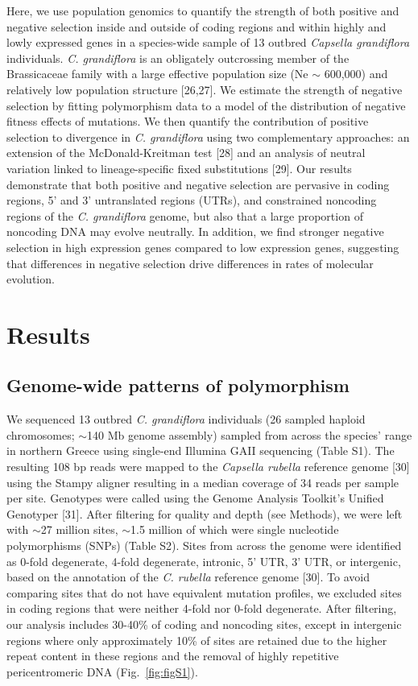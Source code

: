 Here, we use population genomics to quantify the strength of both positive and negative selection inside and outside of coding regions and within highly and lowly expressed genes in a species-wide sample of 13 outbred \textit{Capsella grandiflora} individuals. \textit{C. grandiflora} is an obligately outcrossing member of the Brassicaceae family with a large effective population size (Ne $\sim$ 600,000) and relatively low population structure [26,27]. We estimate the strength of negative selection by fitting polymorphism data to a model of the distribution of negative fitness effects of mutations. We then quantify the contribution of positive selection to divergence in \textit{C. grandiflora} using two complementary approaches: an extension of the McDonald-Kreitman test [28] and an analysis of neutral variation linked to lineage-specific fixed substitutions [29]. Our results demonstrate that both positive and negative selection are pervasive in coding regions, 5’ and 3’ untranslated regions (UTRs), and constrained noncoding regions of the \textit{C. grandiflora} genome, but also that a large proportion of noncoding DNA may evolve neutrally. In addition, we find stronger negative selection in high expression genes compared to low expression genes, suggesting that differences in negative selection drive differences in rates of molecular evolution.

\section{Results}
\subsection{Genome-wide patterns of polymorphism}

We sequenced 13 outbred \textit{C. grandiflora} individuals (26 sampled haploid chromosomes; $\sim$140 Mb genome assembly) sampled from across the species' range in northern Greece using single-end Illumina GAII sequencing (Table S1). The resulting 108 bp reads were mapped to the \textit{Capsella rubella} reference genome [30] using the Stampy aligner resulting in a median coverage of 34 reads per sample per site. Genotypes were called using the Genome Analysis Toolkit’s Unified Genotyper [31]. After filtering for quality and depth (see Methods), we were left with $\sim$27 million sites, $\sim$1.5 million of which were single nucleotide polymorphisms (SNPs) (Table S2). Sites from across the genome were identified as 0-fold degenerate, 4-fold degenerate, intronic, 5’ UTR, 3’ UTR, or intergenic, based on the annotation of the \textit{C. rubella} reference genome [30]. To avoid comparing sites that do not have equivalent mutation profiles, we excluded sites in coding regions that were neither 4-fold nor 0-fold degenerate. After filtering, our analysis includes 30-40\% of coding and noncoding sites, except in intergenic regions where only approximately 10\% of sites are retained due to the higher repeat content in these regions and the removal of highly repetitive pericentromeric DNA (Fig.~\ref{fig:figS1}). 

